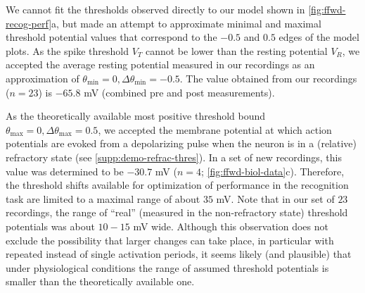 We cannot fit the thresholds observed directly to our model shown in \autoref{fig:ffwd-recog-perf}a,
        but made an attempt to approximate minimal and maximal threshold potential values
        that correspond to the $-0.5$ and $0.5$ edges of the model plots.
    As the spike threshold $V_T$ cannot be lower than the resting potential $V_R$,
        we accepted the average resting potential measured in our recordings
        as an approximation of
        $\theta_{\mathrm{min}} = 0, \Delta \theta_{\mathrm{min}} = -0.5$.
    The value obtained from our recordings ($n=23$) is $-65.8$ mV
        (combined pre and post measurements).

As the theoretically available most positive threshold bound
        $\theta_{\mathrm{max}} = 0, \Delta \theta_{\mathrm{max}} = 0.5$,
        we accepted the membrane potential at which action potentials are evoked
            from a depolarizing pulse when the neuron is in a (relative) refractory state
        (see \autoref{supp:demo-refrac-thres}).
    In a set of new recordings, this value was determined to be $-30.7$ mV
        ($n=4$; \autoref{fig:ffwd-biol-data}c).
    Therefore, the threshold shifts available for optimization of performance in the recognition task
        are limited to a maximal range of about $35$ mV.
    Note that in our set of $23$ recordings, the range of ``real'' (measured in the non-refractory state) threshold potentials
        was about $10-15$ mV wide.
    Although this observation does not exclude the possibility that larger changes can take place,
        in particular with repeated instead of single activation periods,
        it seems likely (and plausible) that under physiological conditions
            the range of assumed threshold potentials
            is smaller than the theoretically available one.

